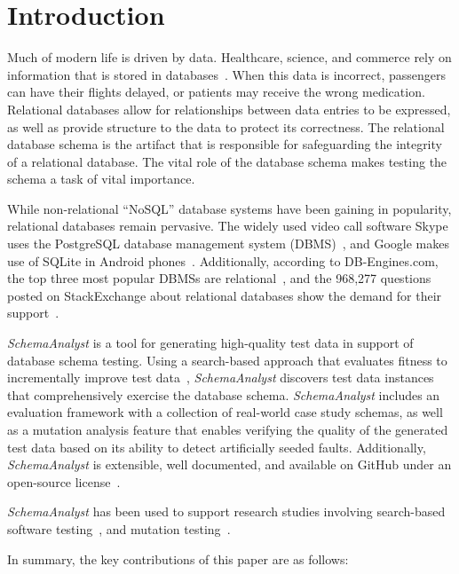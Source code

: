 \section{Introduction}\label{sec:intro}

Much of modern life is driven by data.  Healthcare, science, and commerce rely on information that is stored in
databases~\cite{kapfhammer2007comprehensive}.  When this data is incorrect, passengers can have their flights delayed,
or patients may receive the wrong medication.  Relational databases allow for relationships between data entries to be
expressed, as well as provide structure to the data to protect its correctness. The relational database schema is the
artifact that is responsible for safeguarding the integrity of a relational database. The vital role of the database
schema makes testing the schema a task of vital importance.

While non-relational ``NoSQL'' database systems have been gaining in popularity, relational databases remain pervasive.
The widely used video call software Skype uses the PostgreSQL database management system (DBMS)~\cite{postgres}, and
Google makes use of SQLite in Android phones~\cite{sqlite}.  Additionally, according to DB-Engines.com, the top three
most popular DBMSs are relational~\cite{dbrank}, and the 968,277 questions posted on StackExchange about relational
databases show the demand for their support~\cite{stackexchange}.

\textit{SchemaAnalyst} is a tool for generating high-quality test data in support of database schema testing. Using a
search-based approach that evaluates fitness to incrementally improve test data~\cite{Korel:AVM}, \textit{SchemaAnalyst}
discovers test data instances that comprehensively exercise the database schema.  \textit{SchemaAnalyst} includes an
evaluation framework with a collection of real-world case study schemas, as well as a mutation analysis feature that
enables verifying the quality of the generated test data based on its ability to detect artificially seeded faults.
Additionally, \textit{SchemaAnalyst} is extensible, well documented, and available on GitHub under an open-source
license~\cite{tool}.

\textit{SchemaAnalyst} has been used to support research studies involving search-based software
testing~\cite{kapfhammer2013search,mcminn2015effectiveness,kinneer2015automatically}, and mutation
testing~\cite{wright2013efficient,wright2014impact,wright2015mutation,mcminn2016virtual}.

In summary, the key contributions of this paper are as follows:

